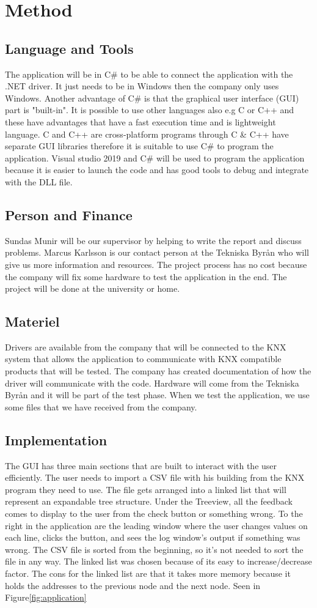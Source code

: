 \documentclass{article}
\begin{document}
\section{Method}
\subsection{Language and Tools}
The application will be in C\# to be able to connect the application with the .NET driver. It just needs to be in Windows then the company only uses Windows. Another advantage of C\# is that the graphical user interface (GUI) part is "built-in". It is possible to use other languages also e.g C or C++ and these have advantages that have a fast execution time and is lightweight language. C and C++ are cross-platform programs through C \& C++ have separate GUI libraries therefore it is suitable to use C\# to program the application. Visual studio 2019 and C\# will be used to program the application because it is easier to launch the code and has good tools to debug and integrate with the DLL file.\cite{CPROG}
\subsection{Person and Finance}
Sundas Munir will be our supervisor by helping to write the report and discuss problems. Marcus Karlsson is our contact person 
at the Tekniska Byrån who will give us more information and resources. The project process has no cost because the company will fix 
some hardware to test the application in the end. The project will be done at the university or home.
\subsection{Materiel}
Drivers are available from the company that will be connected to the KNX system that allows the application to communicate with KNX compatible products that will be tested. The company has created documentation of how the driver will communicate with the code. Hardware will come from the Tekniska Byrån and it will be part of the test phase. When we test the application, we use some files that we have received from the company. 
\subsection{Implementation}
The GUI has three main sections that are built to interact with the user efficiently. The user needs to import a CSV file with his building from the KNX program they need to use. The file gets arranged into a linked list that will represent an expandable tree structure. Under the Treeview, all the feedback comes to display to the user from the check button or something wrong. To the right in the application are the leading window where the user changes values on each line, clicks the button, and sees the log window's output if something was wrong. The CSV file is sorted from the beginning, so it's not needed to sort the file in any way. The linked list was chosen because of its easy to increase/decrease factor. The cons for the linked list are that it takes more memory because it holds the addresses to the previous node and the next node. Seen in Figure\ref{fig:application}
\end{document}
